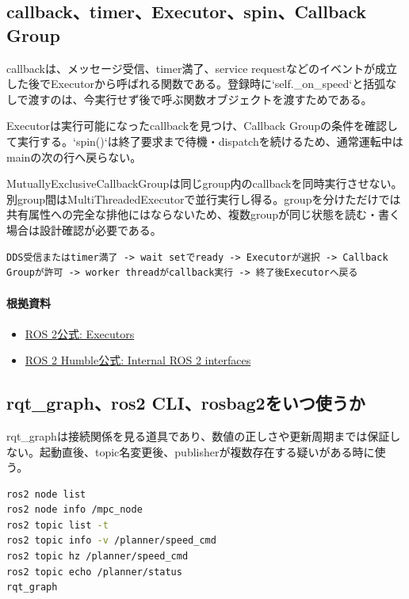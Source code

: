 \documentclass[a4paper,11pt]{article}
\begin{document}
\subsection{callback、timer、Executor、spin、Callback Group}
callbackは、メッセージ受信、timer満了、service requestなどのイベントが成立した後でExecutorから呼ばれる関数である。登録時に`self.\_on\_speed`と括弧なしで渡すのは、今実行せず後で呼ぶ関数オブジェクトを渡すためである。


Executorは実行可能になったcallbackを見つけ、Callback Groupの条件を確認して実行する。`spin()`は終了要求まで待機・dispatchを続けるため、通常運転中はmainの次の行へ戻らない。


MutuallyExclusiveCallbackGroupは同じgroup内のcallbackを同時実行させない。別group間はMultiThreadedExecutorで並行実行し得る。groupを分けただけでは共有属性への完全な排他にはならないため、複数groupが同じ状態を読む・書く場合は設計確認が必要である。


\begin{lstlisting}
DDS受信またはtimer満了 -> wait setでready -> Executorが選択 -> Callback Groupが許可 -> worker threadがcallback実行 -> 終了後Executorへ戻る
\end{lstlisting}

\paragraph{根拠資料}
\begin{itemize}[leftmargin=1.6em]
\item \href{https://docs.ros.org/en/rolling/Concepts/Intermediate/About-Executors.html}{ROS 2公式: Executors}
\item \href{https://docs.ros.org/en/humble/Concepts/About-Internal-Interfaces.html}{ROS 2 Humble公式: Internal ROS 2 interfaces}
\end{itemize}

\subsection{rqt\_graph、ros2 CLI、rosbag2をいつ使うか}
rqt\_graphは接続関係を見る道具であり、数値の正しさや更新周期までは保証しない。起動直後、topic名変更後、publisherが複数存在する疑いがある時に使う。


\begin{lstlisting}[language=bash]
ros2 node list
ros2 node info /mpc_node
ros2 topic list -t
ros2 topic info -v /planner/speed_cmd
ros2 topic hz /planner/speed_cmd
ros2 topic echo /planner/status
rqt_graph
\end{lstlisting}
\end{document}
